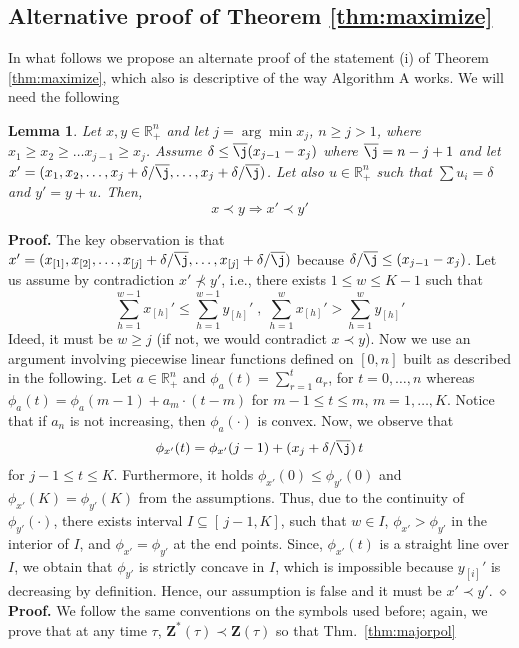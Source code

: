 \documentclass[10pt,twocolumn,conference,final]{IEEEtran}
\def\endpf{\hfill$\diamond$}
\newtheorem{lma}{Lemma}[section]
\newcommand{\Z}{\mathbf Z}
\begin{document}
\subsection{\bf Alternative proof of Theorem \ref{thm:maximize}}
In what follows we propose an alternate proof of the statement (i) of Theorem \ref{thm:maximize},
 which also is descriptive of the way Algorithm A works. We will need the following 
\begin{lma}\label{lem:lmax}
Let $x,y \in {\mathbb R}_+^n$ and let $j=\arg\min x_{j}$, $n \geq j > 1$, where $x_1\geq x_2 \geq \ldots x_{j-1} \geq x_j$. Assume $\delta\leq \overline \j(x_{j-1} - x_j)$ 
where $\overline \j=n-j+1$ and let $x'=(x_1,x_2,\ldots,x_j+\delta/\overline \j,\ldots,x_j+\delta/\overline \j)$.
Let also $u\in {\mathbb R}_+^n$ such that $\sum u_i=\delta$ and $y'=y+u$. Then, 
\[
x \prec y \Rightarrow x' \prec y'
\]
\end{lma}
{\bf Proof.} The key observation is that $x'=(x_{[1]},x_{[2]},\ldots,x_{[j]}+\delta/\overline \j,\ldots,x_{[j]}+\delta/\overline \j)$ 
because $\delta/\overline \j\leq (x_{j-1} - x_j)$. Let us assume by contradiction $x'\not \prec y'$, i.e., there exists 
$1\leq w \leq K-1$ such that 
\[
\sum_{h=1}^{w-1}x_{[h]}'\leq \sum_{h=1}^{w-1}y_{[h]}'\;,\; \sum_{h=1}^{w}x_{[h]}'> \sum_{h=1}^{w}y_{[h]}'
\]
Ideed, it must be $w \geq j$ (if not, we would contradict $x \prec y$). Now we use 
an argument involving piecewise linear functions defined on $[0,n]$ 
built as described in the following. Let $a\in {\mathbb R}_+^n$ and $\phi_a(t)=\sum_{r=1}^t a_r$, 
for $t=0,\ldots,n$ whereas $\phi_a(t)=\phi_a(m-1)+ a_m \cdot (t-m)$ for $m-1 \leq t\leq m$, $m=1,\ldots,K$.
Notice that if $a_n$ is not increasing, then $\phi_a(\cdot)$ is convex.
Now, we observe that 
\[
\phi_{x'}(t)=\phi_{x'}(j-1)+(x_j+\delta/\overline \j) \, t
\] 
for $j-1 \leq t\leq K$. Furthermore, it holds $\phi_{x'}(0)\leq \phi_{y'}(0)$ and $\phi_{x'}(K)=\phi_{y'}(K)$ 
from the assumptions. Thus, due to the continuity of $\phi_{y'}(\cdot)$, there exists interval $I \subseteq [\,j-1,K]$,
such that $w\in I$, $\phi_{x'}>\phi_{y'}$ in the interior of $I$, and $\phi_{x'}=\phi_{y'}$ at the end points. 
Since, $\phi_{x'}(t)$ is a straight line over $I$, we obtain that $\phi_{y'}$ is strictly concave in $I$, which 
is impossible because $y_{[i]}'$ is decreasing by definition. Hence, our assumption is false and it must be $x' \prec y'$.
\endpf\\
{\bf Proof.} We follow the same conventions on the symbols used before; again, we prove 
that at any time $\tau$, $\Z^*(\tau ) \prec \Z (\tau) $ so that Thm.~\ref{thm:majorpol} 
\end{document}
